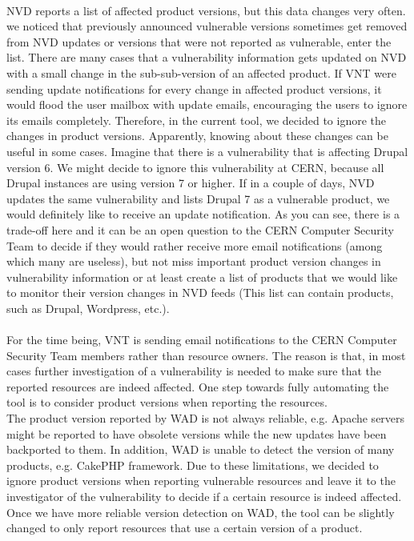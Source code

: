 \paragraph{}
NVD reports a list of affected product versions, but this data changes very often. we noticed that previously announced vulnerable versions sometimes get removed from NVD updates or versions that were not reported as vulnerable, enter the list. There are many cases that a vulnerability information gets updated on NVD with a small change in the sub-sub-version of an affected product. If VNT were sending update notifications for every change in affected product versions, it would flood the user mailbox with update emails, encouraging the users to ignore its emails completely. Therefore, in the current tool, we decided to ignore the changes in product versions. Apparently, knowing about these changes can be useful in some cases. Imagine that there is a vulnerability that is affecting Drupal version 6. We might decide to ignore this vulnerability at CERN, because all Drupal instances are using version 7 or higher. If in a couple of days, NVD updates the same vulnerability and lists Drupal 7 as a vulnerable product, we would definitely like to receive an update notification. As you can see, there is a trade-off here and it can be an open question to the CERN Computer Security Team to decide if they would rather receive more email notifications (among which many are useless), but not miss important product version changes in vulnerability information or at least create a list of products that we would like to monitor their version changes in NVD feeds (This list can contain products, such as Drupal, Wordpress, etc.).
\paragraph{}
For the time being, VNT is sending email notifications to the CERN Computer Security Team members rather than resource owners. The reason is that, in most cases further investigation of a vulnerability is needed to make sure that the reported resources are indeed affected. One step towards fully automating the tool is to consider product versions when reporting the resources.
\\
The product version reported by WAD is not always reliable, e.g. Apache servers might be reported to have obsolete versions while the new updates have been backported to them. In addition, WAD is unable to detect the version of many products, e.g. CakePHP framework. Due to these limitations, we decided to ignore product versions when reporting vulnerable resources and leave it to the investigator of the vulnerability to decide if a certain resource is indeed affected. Once we have more reliable version detection on WAD, the tool can be slightly changed to only report resources that use a certain version of a product.
